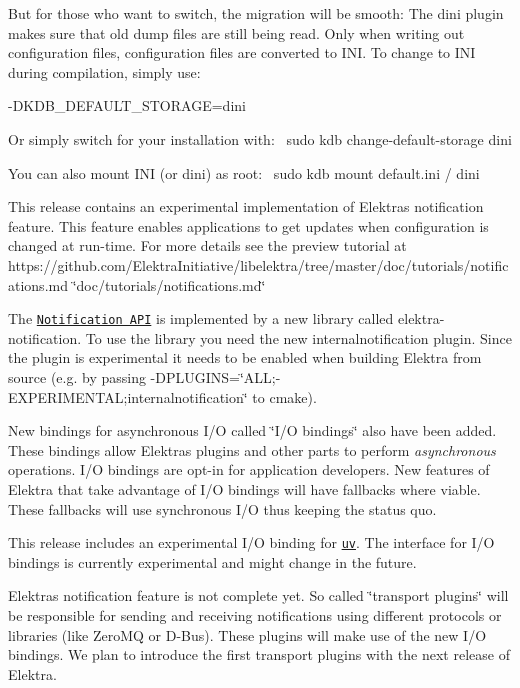 But for those who want to switch, the migration will be smooth\+: The {\ttfamily dini} plugin makes sure that old dump files are still being read. Only when writing out configuration files, configuration files are converted to I\+NI. To change to I\+NI during compilation, simply use\+:

{\ttfamily -\/\+D\+K\+D\+B\+\_\+\+D\+E\+F\+A\+U\+L\+T\+\_\+\+S\+T\+O\+R\+A\+GE=dini}

Or simply switch for your installation with\+:~\newline
 {\ttfamily sudo kdb change-\/default-\/storage dini}

You can also mount I\+NI (or dini) as root\+:~\newline
 {\ttfamily sudo kdb mount default.\+ini / dini}

This release contains an experimental implementation of Elektra\textquotesingle{}s notification feature. This feature enables applications to get updates when configuration is changed at run-\/time. For more details see the preview tutorial at https\+://github.com/\+Elektra\+Initiative/libelektra/tree/master/doc/tutorials/notifications.\+md \char`\"{}doc/tutorials/notifications.\+md\char`\"{}

The \href{https://doc.libelektra.org/api/current/html/kdbnotification_8h.html}{\tt Notification A\+PI} is implemented by a new library called {\ttfamily elektra-\/notification}. To use the library you need the new internalnotification plugin. Since the plugin is experimental it needs to be enabled when building Elektra from source (e.\+g. by passing {\ttfamily -\/\+D\+P\+L\+U\+G\+I\+NS=\char`\"{}\+A\+L\+L;-\/\+E\+X\+P\+E\+R\+I\+M\+E\+N\+T\+A\+L;internalnotification\char`\"{}} to {\ttfamily cmake}).

New bindings for asynchronous I/O called \char`\"{}\+I/\+O bindings\char`\"{} also have been added. These bindings allow Elektra\textquotesingle{}s plugins and other parts to perform {\itshape asynchronous} operations. I/O bindings are opt-\/in for application developers. New features of Elektra that take advantage of I/O bindings will have fallbacks where viable. These fallbacks will use synchronous I/O thus keeping the status quo.

This release includes an experimental I/O binding for \href{http://libuv.org/}{\tt uv}. The interface for I/O bindings is currently experimental and might change in the future.

Elektra\textquotesingle{}s notification feature is not complete yet. So called \char`\"{}transport plugins\char`\"{} will be responsible for sending and receiving notifications using different protocols or libraries (like Zero\+MQ or D-\/\+Bus). These plugins will make use of the new I/O bindings. We plan to introduce the first transport plugins with the next release of Elektra.

